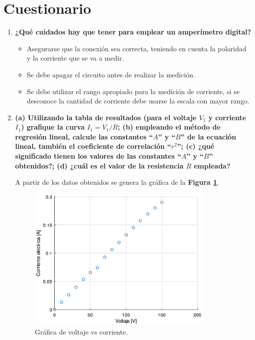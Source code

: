 \documentclass[letter,11pt]{article}
\begin{document}
\newpage

\section{Cuestionario}

\begin{enumerate}

\item \textbf{¿Qué cuidados hay que tener para emplear un amperímetro
digital?} \\

\begin{itemize}
    \item Asegurarse que la conexión sea correcta, teniendo en cuenta la
    polaridad y la corriente que se va a medir.
    \item Se debe apagar el circuito antes de realizar la medición.
    \item Se debe utilizar el rango apropiado para la medición de corriente, si
    se desconoce la cantidad de corriente debe usarse la escala con mayor rango.
\end{itemize}

\item \textbf{(a) Utilizando la tabla de resultados (para el voltaje $V_1$ y
corriente $I_1$) grafique la curva $I_1=V_1/R$; (b) empleando el método de
regresión lineal, calcule las constantes ``$A$'' y ``$B$'' de la ecuación
lineal, también el coeficiente de correlación ``$r^2$''; (c) ¿qué significado
tienen los valores de las constantes ``$A$'' y ``$B$'' obtenidos?; (d) ¿cuál es
el valor de la resistencia $R$ empleada?}

A partir de los datos obtenidos se genera la gráfica de la
\textbf{Figura \ref{figura}}.

\begin{figure}[!h]
\centering
\includegraphics[width=0.85\textwidth]{resources/o1.eps}
\caption{Gráfica de voltaje vs corriente.}
\label{figura}
\end{figure}


\end{enumerate}
\end{document}
